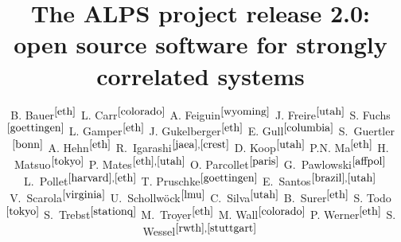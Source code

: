 \documentclass[12pt]{iopart}
\begin{document}
\title{The ALPS project release 2.0: \\ open source software for strongly correlated systems}


\newcommand{\myauthor}[3]{#2$^{#1}$}
\newcommand{\myaddress}[2]{\address{\refstepcounter{affiliation} $^{\arabic{affiliation}}$#2 \label{#1}}}

\author{
	\myauthor{\ref{eth}}{B. Bauer}{bauerb@phys.ethz.ch}
	\myauthor{\ref{colorado}}{L. Carr}{lcarr@mines.edu}
	\myauthor{\ref{wyoming}}{A. Feiguin}{afeiguin@uwyo.edu}
	\myauthor{\ref{utah}}{J. Freire}{juliana@cs.utah.edu}
	\myauthor{\ref{goettingen}}{S. Fuchs}{fuchs@theorie.physik.uni-goettingen.de}
	\myauthor{\ref{eth}}{L. Gamper}{gamperl@gmail.com}
	\myauthor{\ref{eth}}{J. Gukelberger}{gukelberger@phys.ethz.ch}
	\myauthor{\ref{columbia}}{E. Gull}{gull@phys.columbia.edu}
	\myauthor{\ref{bonn}}{S.~Guertler}{guertler@th.physik.uni-bonn.de}
	\myauthor{\ref{eth}}{A. Hehn}{hehn@phys.ethz.ch}
	\myauthor{\ref{jaea},\ref{crest}}{R.~Igarashi}{rigarash@hosi.phys.s.u-tokyo.ac.jp}
	\myauthor{\ref{utah}}{D. Koop}{dakoop@cs.utah.edu}
	\myauthor{\ref{eth}}{P.N. Ma}{pingnang@phys.ethz.ch}
	\myauthor{\ref{tokyo}}{H. Matsuo}{halm@looper.t.u-tokyo.ac.jp}
	\myauthor{\ref{eth},\ref{utah}}{P. Mates}{phillipmates@gmail.com}
	\myauthor{\ref{paris}}{O. Parcollet}{parcolle@spht.saclay.cea.fr}
	\myauthor{\ref{affpol}}{G.~Pawlowski}{gpawlo@amu.edu.pl}
	\myauthor{\ref{harvard},\ref{eth}}{L.~Pollet}{pollet@phys.ethz.ch}
	\myauthor{\ref{goettingen}}{T. Pruschke}{pruschke@theorie.physik.uni-goettingen.de}
	\myauthor{\ref{brazil},\ref{utah}}{E.~Santos}{emanuele@sci.utah.edu}
	\myauthor{\ref{virginia}}{V.~Scarola}{scarola@vt.edu}
	\myauthor{\ref{lmu}}{U.~Schollw\"ock}{schollwoeck@lmu.de}
	\myauthor{\ref{utah}}{C.~Silva}{csilva@sci.utah.edu}
	\myauthor{\ref{eth}}{B.~Surer}{surerb@phys.ethz.ch}
	\myauthor{\ref{tokyo}}{S. Todo}{wistaria@ap.t.u-tokyo.ac.jp}
	\myauthor{\ref{stationq}}{S.~Trebst}{trebst@kitp.ucsb.edu}
	\myauthor{\ref{eth}}{M.~Troyer}{troyer@ethz.ch}
	\myauthor{\ref{colorado}}{M. Wall}{mwall@mymail.mines.edu}
	\myauthor{\ref{eth}}{P. Werner}{werner@phys.ethz.ch}
	\myauthor{\ref{rwth},\ref{stuttgart}}{S. Wessel}{wessel@phys.ethz.ch}
}
\end{document}
